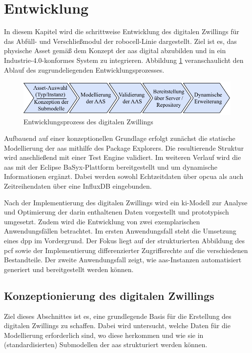 \newpage
\section{Entwicklung}
\label{sec:Entwicklung}
In diesem Kapitel wird die schrittweise Entwicklung des digitalen Zwillings für das Abfüll- und Verschließmodul der robocell-Linie dargestellt.
Ziel ist es, das physische Asset gemäß dem Konzept der \acs{aas} digital abzubilden und in ein Industrie-4.0-konformes System zu integrieren.
Abbildung \ref{fig:Entwicklungsschritte} veranschaulicht den Ablauf des zugrundeliegenden Entwicklungsprozesses.

\begin{figure}[htbp]
    \centering
    \includegraphics[width=1\textwidth]{Bilder/vorgehenEntwicklungsteil.pdf}
    \caption[Entwicklungsprozess des digitalen Zwillings]{Entwicklungsprozess des digitalen Zwillings}
    \label{fig:Entwicklungsschritte}
\end{figure}
\vspace{-0.5em}

Aufbauend auf einer konzeptionellen Grundlage erfolgt zunächst die statische Modellierung der \acs{aas} mithilfe des Package Explorers. 
Die resultierende Struktur wird anschließend mit einer Test Engine validiert.
Im weiteren Verlauf wird die \acs{aas} mit der Eclipse BaSyx-Plattform bereitgestellt und um dynamische Informationen ergänzt. 
Dabei werden sowohl Echtzeitdaten über \acs{opcua} als auch Zeitreihendaten über eine InfluxDB eingebunden.

Nach der Implementierung des digitalen Zwillings wird ein \acs{ki}-Modell zur Analyse und Optimierung der darin enthaltenen Daten vorgestellt und prototypisch umgesetzt.
Zudem wird die Entwicklung von zwei exemplarischen Anwendungsfällen betrachtet.
Im ersten Anwendungsfall steht die Umsetzung eines \acs{dpp} im Vordergrund. 
Der Fokus liegt auf der strukturierten Abbildung des \ac{pcf} sowie der Implementierung differenzierter Zugriffsrechte auf die verschiedenen Bestandteile.
Der zweite Anwendungsfall zeigt, wie \acs{aas}-Instanzen automatisiert generiert und bereitgestellt werden können.

\subsection{Konzeptionierung des digitalen Zwillings}
Ziel dieses Abschnittes ist es, eine grundlegende Basis für die Erstellung des digitalen Zwillings zu schaffen.
Dabei wird untersucht, welche Daten für die Modellierung erforderlich sind, wo diese herkommen und wie sie in (standardisierten) Submodellen der \acs{aas} strukturiert werden können.
